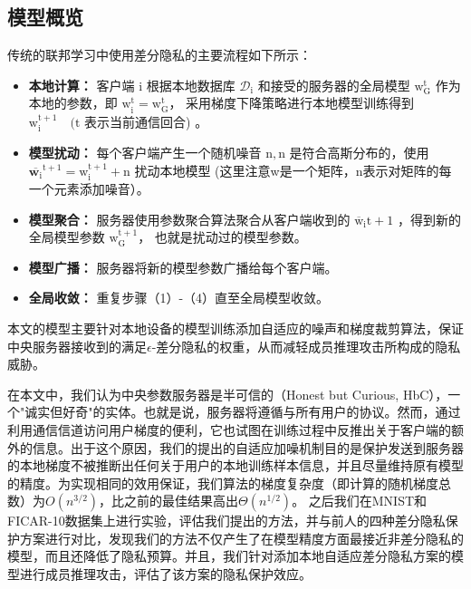 \subsection{模型概览}
传统的联邦学习中使用差分隐私的主要流程如下所示：
\begin{itemize}
\item \textbf{本地计算：}
客户端 $\mathrm{i}$ 根据本地数据库 $\mathcal{D}_{\mathrm{i}}$ 和接受的服务器的全局模型 $\mathrm{w}_{\mathrm{G}}^{\mathrm{t}}$ 作为本地的参数，即 $\mathrm{w}_{\mathrm{i}}^{\mathrm{t}}=\mathrm{w}_{\mathrm{G}}^{\mathrm{t}}$， 采用梯度下降策略进行本地模型训练得到 $\mathrm{w}_{\mathrm{i}}^{\mathrm{t}+1} \quad(\mathrm{t}$ 表示当前通信回合) 。

\item \textbf{模型扰动：}
每个客户端产生一个随机噪音 $\mathrm{n},\mathrm{n}$ 是符合高斯分布的，使用 $\overline{\mathbf{w}_{\mathrm{i}}}^{\mathrm{t}+1}=\mathrm{w}_{\mathrm{i}}^{\mathrm{t}+1}+\mathrm{n}$ 扰动本地模型 (这里注意w是一个矩阵，n表示对矩阵的每一个元素添加噪音）。

\item \textbf{模型聚合：}
服务器使用参数聚合算法聚合从客户端收到的 $\overline{\mathrm{w}}_{\mathrm{i}} \mathrm{t}+1$ ，得到新的全局模型参数 $\mathrm{w}_{\mathrm{G}}^{\mathrm{t}+1}$， 也就是扰动过的模型参数。

\item \textbf{模型广播：}
服务器将新的模型参数广播给每个客户端。

\item \textbf{全局收敛：}
重复步骤（1）-（4）直至全局模型收敛。
\end{itemize}

本文的模型主要针对本地设备的模型训练添加自适应的噪声和梯度裁剪算法，保证中央服务器接收到的满足$\epsilon$-差分隐私的权重，从而减轻成员推理攻击所构成的隐私威胁。

在本文中，我们认为中央参数服务器是半可信的（Honest but Curious, HbC），一个"诚实但好奇"的实体。也就是说，服务器将遵循与所有用户的协议。然而，通过利用通信信道访问用户梯度的便利，它也试图在训练过程中反推出关于客户端的额外的信息。出于这个原因，我们的提出的自适应加噪机制目的是保护发送到服务器的本地梯度不被推断出任何关于用户的本地训练样本信息，并且尽量维持原有模型的精度。为实现相同的效用保证，我们算法的梯度复杂度（即计算的随机梯度总数）为$O\left(n^{3 / 2}\right)$，比之前的最佳结果高出$\Theta\left(n^{1 / 2}\right)$。 之后我们在MNIST和FICAR-10数据集上进行实验，评估我们提出的方法，并与前人的四种差分隐私保护方案进行对比，发现我们的方法不仅产生了在模型精度方面最接近非差分隐私的模型，而且还降低了隐私预算。并且，我们针对添加本地自适应差分隐私方案的模型进行成员推理攻击，评估了该方案的隐私保护效应。

